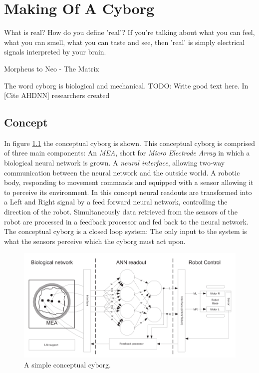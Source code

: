 \chapter{Making Of A Cyborg}
\epigraph{What is real? How do you define 'real'? If you're talking about what
you can feel, what you can smell, what you can taste and see, then 'real' is
simply electrical signals interpreted by your brain.}
{Morpheus to Neo - The Matrix}
The word cyborg is 
biological and mechanical.
TODO: Write good text here.
In [Cite AHDNN] researchers created 
\section{Concept}
In figure \ref{cyborgOverviewSimple} the conceptual cyborg is shown.
This conceptual cyborg is comprised of three main components: An \emph{MEA}, short
for \emph{Micro Electrode Array} in which a biological neural network is grown.
A \emph{neural interface}, allowing two-way communication between the neural network and
the outside world.
A robotic body, responding to movement commands and equipped with a sensor
allowing it to perceive its environment.
In this concept neural readouts are transformed into a Left and Right signal by
a feed forward neural network, controlling the direction of the robot.
Simultaneously data retrieved from the sensors of the robot are processed in a
feedback processor and fed back to the neural network.
The conceptual cyborg is a closed loop system: The only input to the system is
what the sensors perceive which the cyborg must act upon.
\begin{figure}[h!]
  \centering
  \includegraphics[width=1\textwidth]{fig/cyborg_overview.png}
  \caption{A simple conceptual cyborg.}
  \label{cyborgOverviewSimple}
\end{figure}
